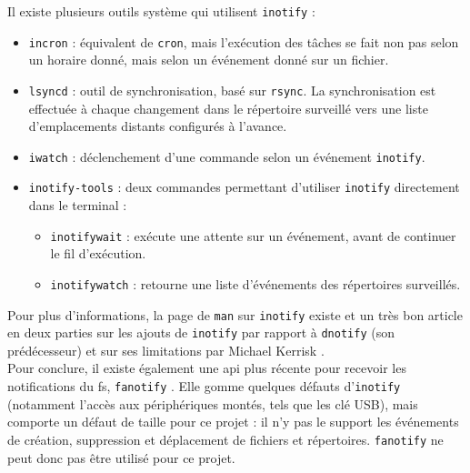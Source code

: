 \documentclass[a4paper, 12pt]{article}
\begin{document}
Il existe plusieurs outils système qui utilisent \texttt{inotify} \cite{ref30} :
\begin{itemize}
    \item \texttt{incron} : équivalent de \texttt{cron}, mais l'exécution 
        des tâches se fait non pas selon un horaire donné, mais selon un événement donné sur un fichier.
    \item \texttt{lsyncd} : outil de synchronisation, basé sur \texttt{rsync}. 
        La synchronisation est effectuée à chaque changement dans le répertoire surveillé vers une 
        liste d'emplacements distants configurés à l'avance.
    \item \texttt{iwatch} : déclenchement d'une commande selon un événement \texttt{inotify}.
    \item \texttt{inotify-tools} : deux commandes permettant d'utiliser \texttt{inotify} 
        directement dans le terminal :
        \begin{itemize}
            \item \texttt{inotifywait} : exécute une attente sur un événement, avant de 
                continuer le fil d'exécution.
            \item \texttt{inotifywatch} : retourne une liste d'événements des répertoires surveillés.
        \end{itemize}
\end{itemize}
Pour plus d'informations, la page de \texttt{man} sur \texttt{inotify} existe \cite{ref29} et 
un très bon article en deux parties sur les ajouts de \texttt{inotify} par rapport à \texttt{dnotify} 
(son prédécesseur) \cite{ref31} et sur ses limitations par Michael Kerrisk \cite{ref32}.
\\
Pour conclure, il existe également une \acrshort{api} plus récente pour recevoir les notifications du 
\acrshort{fs}, \texttt{fanotify} \cite{ref38}. Elle gomme quelques défauts d'\texttt{inotify}
(notamment l'accès aux périphériques montés, tels que les clé USB), mais comporte un défaut de taille 
pour ce projet : il n'y pas le support les événements de création, suppression et déplacement de fichiers 
et répertoires. \texttt{fanotify} ne peut donc pas être utilisé pour ce projet.
\end{document}

